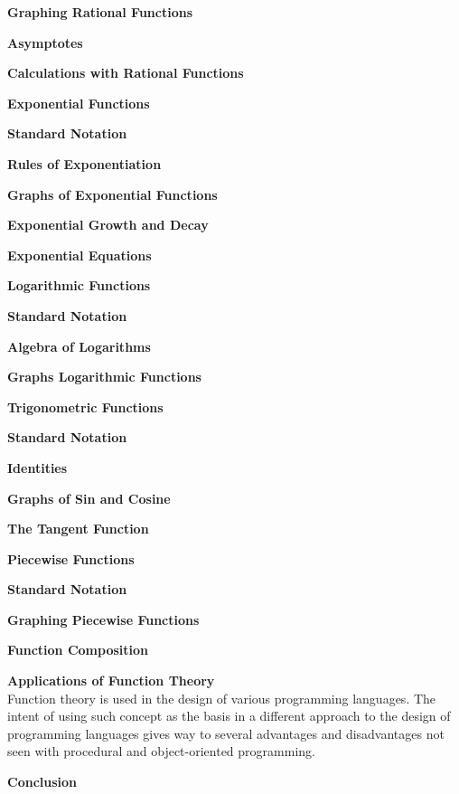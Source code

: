 \documentclass{amsart}
\begin{document}
\begin{outline}
\begin{outline}
\begin{outline}
      \item {\bf Graphing Rational Functions }
      \item {\bf Asymptotes }
      \item {\bf Calculations with Rational Functions }
    \end{outline}
  \item {\bf Exponential Functions }
    \begin{outline}
      \item {\bf Standard Notation }      
      \item {\bf Rules of Exponentiation }
      \item {\bf Graphs of Exponential Functions }
      \item {\bf Exponential Growth and Decay }
      \item {\bf Exponential Equations }
    \end{outline}
  \item {\bf Logarithmic Functions }
    \begin{outline}
      \item {\bf Standard Notation }      
      \item {\bf Algebra of Logarithms }
      \item {\bf Graphs Logarithmic Functions }
    \end{outline}
  \item {\bf Trigonometric Functions }
    \begin{outline}
      \item {\bf Standard Notation }      
      \item {\bf Identities }
      \item {\bf Graphs of Sin and Cosine }
      \item {\bf The Tangent Function }
    \end{outline}
  \item {\bf Piecewise Functions }
    \begin{outline}
      \item {\bf Standard Notation }      
      \item {\bf Graphing Piecewise Functions }
    \end{outline}
\end{outline}
  \item {\bf Function Composition }
  \item {\bf Applications of Function Theory } \\
    Function theory is used in the design of various programming languages. The intent of using such concept as the basis in a different approach to the design of programming languages gives way to several advantages and disadvantages not seen with procedural and object-oriented programming.
  \item {\bf Conclusion }
\end{outline}
\end{document}
